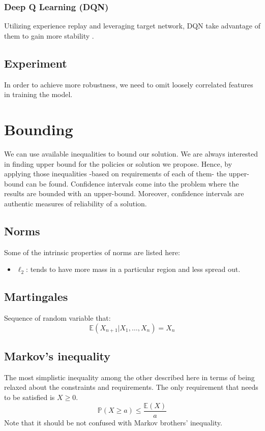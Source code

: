 \documentclass[a4paper,12pt]{article}
\begin{document}
\subsubsection{Deep Q Learning (DQN)}
Utilizing experience replay and leveraging target network, DQN take advantage of them to gain more stability \cite{Pattanaik2018}.

\subsection{Experiment}
In order to achieve more robustness, we need to omit loosely correlated features in training the model.


\section{Bounding}
We can use available inequalities to bound our solution. We are always interested in finding upper bound for the policies or solution we propose. Hence, by applying those inequalities -based on requirements of each of them- the upper-bound can be found. Confidence intervals come into the problem where the results are bounded with an upper-bound. Moreover, confidence intervals are authentic measures of reliability of a solution.

\subsection{Norms}
Some of the intrinsic properties of norms are listed here:
\begin{itemize}
    \item $\ell_2$: tends to have more mass in a particular region and less spread out. 
\end{itemize}

\subsection{Martingales}
Sequence of random variable that:
\begin{equation}
    \mathbb { E } \left( X _ { n + 1 } | X _ { 1 } , \ldots , X _ { n } \right) = X _ { n }
\end{equation}

\subsection{Markov's inequality}
The most simplistic inequality among the other described here in terms of being relaxed about the constraints and requirements. The only requirement that needs to be satisfied is $X \geq 0$.
\begin{equation}
\mathbb {P}(X \geq a ) \leq \frac { \mathbb { E}( X ) } { a }
\end{equation}
Note that it should be not confused with Markov brothers' inequality.
\end{document}
